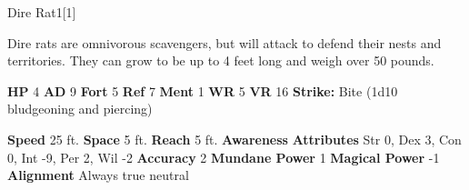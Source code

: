   \begin{monsection}{Dire Rat}{1}[1]
    \vspace{-1em}\vspace{-1em}
    \vspace{0em}

    
      Dire rats are omnivorous scavengers, but will attack to defend their nests and territories.
      They can grow to be up to 4 feet long and weigh over 50 pounds.
    
    

    \begin{spellcontent}
      \begin{spelltargetinginfo}
        \pari \textbf{HP} 4 \monsep
          \textbf{AD} 9 \monsep
          \textbf{Fort} 5 \monsep
          \textbf{Ref} 7 \monsep
          \textbf{Ment} 1
        \pari \textbf{WR} 5 \monsep
        \textbf{VR} 16
        \pari \textbf{Strike:}
            Bite  (1d10 bludgeoning and piercing)
      \end{spelltargetinginfo}
    \end{spellcontent}
    \begin{monsterfooter}
      \pari \textbf{Speed} 25 ft. \monsep
        \textbf{Space} 5 ft. \monsep
        \textbf{Reach} 5 ft.
      \pari \textbf{Awareness} 
      \pari \textbf{Attributes}
        Str 0, Dex 3,
        Con 0, Int -9,
        Per 2, Wil -2
      \pari \textbf{Accuracy} 2 \monsep
        \textbf{Mundane Power} 1 \monsep
      \textbf{Magical Power} -1
      \pari \textbf{Alignment} Always true neutral
    \end{monsterfooter}
  \end{monsection}
  
